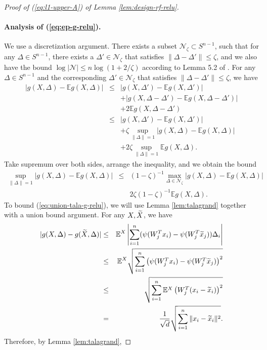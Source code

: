 \begin{proof}[Proof of (\ref{eq:l1-upper-A}) of Lemma \ref{lem:design-rf-relu}]
\paragraph{Analysis of (\ref{eq:ep-g-relu}).} We use a discretization argument. There exists a subset $\mathcal{N}_{\zeta}\subset S^{n-1}$, such that for any $\Delta\in S^{n-1}$, there exists a $\Delta'\in\mathcal{N}_{\zeta}$ that satisfies $\|\Delta-\Delta'\|\leq\zeta$, and we also have the bound $\log|\mathcal{N}|\leq n\log\left(1+2/\zeta\right)$ according to Lemma 5.2 of \cite{vershynin2010introduction}. For any $\Delta\in S^{n-1}$ and the corresponding $\Delta'\in\mathcal{N}_{\zeta}$ that satisfies $\|\Delta-\Delta'\|\leq \zeta$, we have
\begin{eqnarray*}
|g(X,\Delta) - \mathbb{E}g(X,\Delta)| &\leq& |g(X,\Delta')-\mathbb{E}g(X,\Delta')| \\
&& + |g(X,\Delta-\Delta')-\mathbb{E}g(X,\Delta-\Delta')|  \\
&& + 2\mathbb{E}g(X,\Delta-\Delta') \\
&\leq& |g(X,\Delta')-\mathbb{E}g(X,\Delta')| \\
&& + \zeta\sup_{\|\Delta\|=1}|g(X,\Delta)-\mathbb{E}g(X,\Delta)|  \\
&& + 2\zeta\sup_{\|\Delta\|=1}\mathbb{E}g(X,\Delta).
\end{eqnarray*}
Take supremum over both sides, arrange the inequality, and we obtain the bound
\begin{eqnarray}
\label{eq:union-tala-g-relu} \sup_{\|\Delta\|=1}|g(X,\Delta) - \mathbb{E}g(X,\Delta)| &\leq& (1-\zeta)^{-1}\max_{\Delta\in\mathcal{N}_{\zeta}}|g(X,\Delta) - \mathbb{E}g(X,\Delta)| \\
\label{eq:small-exp-relu} && 2\zeta(1-\zeta)^{-1}\mathbb{E}g(X,\Delta).
\end{eqnarray}
To bound (\ref{eq:union-tala-g-relu}), we will use Lemma \ref{lem:talagrand} together with a union bound argument. For any $X,\widetilde{X}$, we have
\begin{eqnarray*}
|g(X,\Delta)-g(\wt{X},\Delta)| &\leq& \mathbb{E}^X\left|\sum_{i=1}^n(\psi(W_j^Tx_i)-\psi(W_j^T\wt{x}_j))\Delta_i\right| \\
&\leq& \mathbb{E}^X\sqrt{\sum_{i=1}^n\left(\psi(W_j^Tx_i)-\psi(W_j^T\wt{x}_j)\right)^2} \\
&\leq& \sqrt{\sum_{i=1}^n\mathbb{E}^X\left(W_j^T(x_i-\wt{x}_i)\right)^2} \\
&=& \frac{1}{\sqrt{d}}\sqrt{\sum_{i=1}^n\|x_i-\wt{x}_i\|^2}.
\end{eqnarray*}
Therefore, by Lemma \ref{lem:talagrand},

\end{proof}
